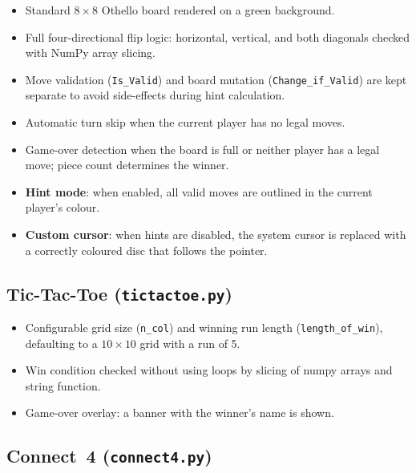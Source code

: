 \documentclass[12pt]{article}
\begin{document}
\begin{itemize}
    \item Standard $8 \times 8$ Othello board rendered on a green background.
    \item Full four-directional flip logic: horizontal, vertical, and both diagonals checked with NumPy array slicing.
    \item Move validation (\texttt{Is\_Valid}) and board mutation (\texttt{Change\_if\_Valid}) are kept separate to avoid side-effects during hint calculation.
    \item Automatic turn skip when the current player has no legal moves.
    \item Game-over detection when the board is full or neither player has a legal move; piece count determines the winner.
    \item \textbf{Hint mode}: when enabled, all valid moves are outlined in the current player's colour.
    \item \textbf{Custom cursor}: when hints are disabled, the system cursor is replaced with a correctly coloured disc that follows the pointer.
\end{itemize}
 
\subsection{Tic-Tac-Toe (\texttt{tictactoe.py})}
 
\begin{itemize}
    \item Configurable grid size (\texttt{n\_col}) and winning run length (\texttt{length\_of\_win}), defaulting to a $10 \times 10$ grid with a run of 5.
    \item Win condition checked without using loops by slicing of numpy arrays and string function.
    \item Game-over overlay: a banner with the winner's name is shown.
\end{itemize}
 
\subsection{Connect~4 (\texttt{connect4.py})}
 
\end{document}
